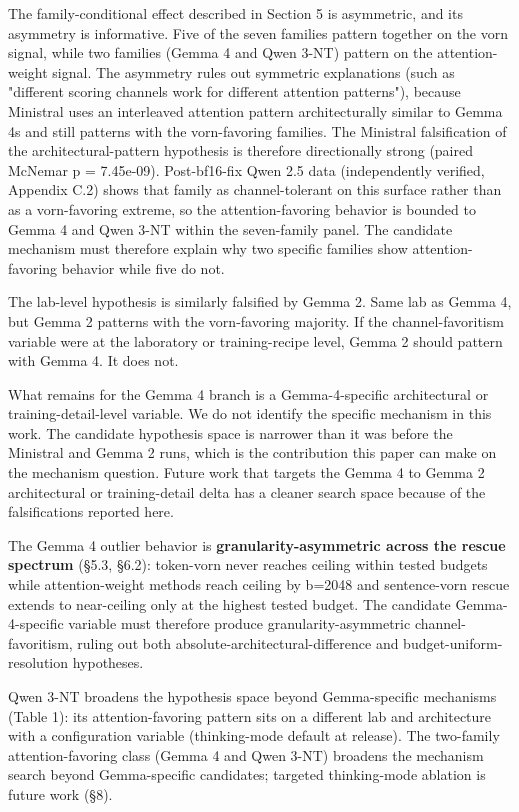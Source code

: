 \documentclass[10pt]{article}
\begin{document}
The family-conditional effect described in Section 5 is asymmetric, and
its asymmetry is informative. Five of the seven families pattern together on the vorn signal, while
two families (Gemma 4 and Qwen 3-NT) pattern on the attention-weight
signal. The asymmetry rules out
symmetric explanations (such as "different scoring channels work for
different attention patterns"), because Ministral uses an interleaved
attention pattern architecturally similar to Gemma 4\textquotesingle s
and still patterns with the vorn-favoring families. The
Ministral falsification of the architectural-pattern hypothesis is
therefore directionally strong (paired McNemar p = 7.45e-09).
Post-bf16-fix Qwen 2.5 data (independently verified, Appendix C.2)
shows that family as channel-tolerant on this surface rather than as a
vorn-favoring extreme, so the attention-favoring behavior is bounded to Gemma 4 and Qwen 3-NT
within the seven-family panel. The candidate mechanism
must therefore explain why two specific families show
attention-favoring behavior while five do not.

The lab-level hypothesis is similarly falsified by Gemma 2. Same lab
as Gemma 4, but Gemma 2 patterns with the vorn-favoring
majority. If the channel-favoritism variable were at the laboratory or
training-recipe level, Gemma 2 should pattern with Gemma 4. It does not.

What remains for the Gemma 4 branch is a Gemma-4-specific
architectural or training-detail-level variable. We do not identify the specific
mechanism in this work. The candidate hypothesis space is narrower than
it was before the Ministral and Gemma 2 runs, which is the contribution
this paper can make on the mechanism question. Future work that targets
the Gemma 4 to Gemma 2 architectural or training-detail delta has a
cleaner search space because of the falsifications reported here.

The Gemma 4 outlier behavior is \textbf{granularity-asymmetric across
the rescue spectrum} (\S{}5.3, \S{}6.2): token-vorn never reaches ceiling
within tested budgets while attention-weight methods reach ceiling by
b=2048 and sentence-vorn rescue extends to near-ceiling only at the
highest tested budget. The candidate Gemma-4-specific variable must
therefore produce granularity-asymmetric channel-favoritism, ruling
out both absolute-architectural-difference and budget-uniform-
resolution hypotheses.

Qwen 3-NT broadens the hypothesis space beyond Gemma-specific
mechanisms (Table 1): its attention-favoring pattern sits on a
different lab and architecture with a configuration variable
(thinking-mode default at release). The two-family attention-favoring
class (Gemma 4 and Qwen 3-NT) broadens the mechanism search beyond
Gemma-specific candidates; targeted thinking-mode ablation is future
work (\S{}8).
\end{document}
